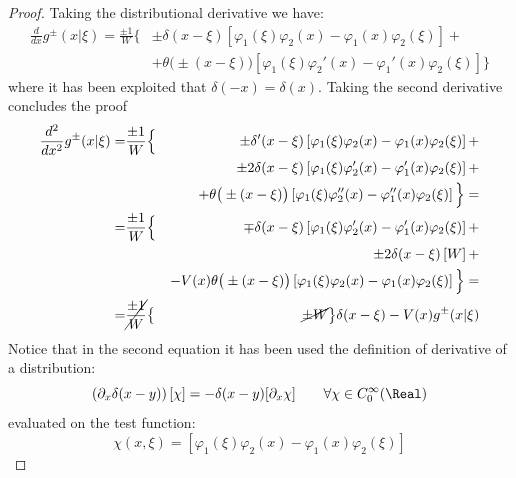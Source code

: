 \documentclass[Main]{subfiles}
\begin{document}
\begin{proof}
		Taking the distributional derivative we have:
		\begin{eqnarray}
		\frac{d}{dx}g^\pm(x \vert \xi) 	=\frac{\pm 1}{W} \Big\{&
						\pm \delta(x-\xi)\left[ \varphi_1(\xi)\varphi_2(x)-\varphi_1(x)\varphi_2(\xi)\right] + \nonumber \\
					&	+ \theta\big( \pm (x-\xi) \big) \left[ \varphi_1(\xi)\varphi_2'(x)-\varphi_1'(x)\varphi_2(\xi)\right]
					\Big\}
		\end{eqnarray}
		where it has been exploited that $\delta(-x) = \delta(x)$.
		Taking the second derivative concludes the proof
		\begin{eqnarray*}
		\frac{d^2}{dx^2}g^\pm(x \vert \xi) 	=&\frac{\pm 1}{W} \Big\{&
						\pm \delta'(x-\xi)\left[ \varphi_1(\xi)\varphi_2(x)-\varphi_1(x)\varphi_2(\xi)\right] +  \\
				&	&	\pm 2\delta(x-\xi) \left[ \varphi_1(\xi)\varphi_2'(x)-\varphi_1'(x)\varphi_2(\xi)\right] +  \\
				& & + \theta\big( \pm (x-\xi) \big) \left[ \varphi_1(\xi)\varphi_2''(x)-\varphi_1''(x)\varphi_2(\xi)\right]
					\Big\}=  \\
				=&\frac{\pm 1}{W} \Big\{&
						\mp \delta(x-\xi)\left[ \varphi_1(\xi)\varphi_2'(x)-\varphi_1'(x)\varphi_2(\xi)\right] +  \\
				&	&	\pm 2\delta(x-\xi) \left[W\right] +  \\
				& & -V(x) \theta\big( \pm (x-\xi) \big) \left[ \varphi_1(\xi)\varphi_2(x)-\varphi_1(x)\varphi_2(\xi)\right]
					\Big\}=  \\
				=&\cancel{ \frac{\pm 1}{W}}\big\{& \cancel{\pm W}\big\} \delta(x-\xi)  - V(x) g^\pm( x \vert \xi)
		\end{eqnarray*}
		Notice that in the second equation it has been used the definition of derivative of a distribution:
		\begin{displaymath}
			\left( \partial_x \delta ( x- y) \right)\left[\chi \right] =  - \delta(x-y) [ \partial_x\chi] \qquad \forall \chi \in C^\infty_0(\Real)
		\end{displaymath}
		evaluated on the test function:
		\begin{displaymath}
			\chi(x,\xi) = \left[ \varphi_1(\xi)\varphi_2(x)-\varphi_1(x)\varphi_2(\xi)\right]
		\end{displaymath}

	\end{proof}
\end{document}
